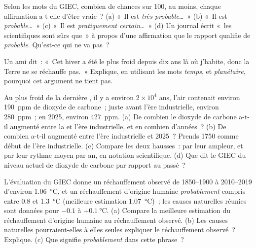 \begin{exercise}[$\star\star$]\label{exo:g9:climate-past-and-present:9}
Selon les mots du GIEC, combien de chances sur 100, au moins, chaque
affirmation a-t-elle d'être vraie~? (a) «~Il est \emph{très probable}\ldots~»
(b) «~Il est \emph{probable}\ldots~» (c) «~Il est \emph{pratiquement
certain}\ldots~» (d) Un journal écrit «~les scientifiques sont sûrs que~» à
propos d'une affirmation que le rapport qualifie de \emph{probable}. Qu'est-ce
qui ne va pas~?
\end{exercise}

\begin{exercise}[$\star\star$]\label{exo:g9:climate-past-and-present:10}
Un ami dit~: «~Cet hiver a été le plus froid depuis dix ans là où
j'habite, donc la Terre ne se réchauffe pas.~» Explique, en utilisant les
mots \emph{temps}, \emph{} et \emph{planétaire}, pourquoi cet
argument ne tient pas.
\end{exercise}

\begin{exercise}[$\star\star\star$]\label{exo:g9:climate-past-and-present:11}
Au plus froid de la dernière , il y a environ $2 \times 10^4$
ans, l'air contenait environ \qty{190}{ppm} de dioxyde de carbone~; juste
avant l'ère industrielle, environ \qty{280}{ppm}~; en 2025, environ
\qty{427}{ppm}. (a) De combien le dioxyde de carbone a-t-il augmenté entre
la  et l'ère industrielle, et en combien d'années~? (b) De
combien a-t-il augmenté entre l'ère industrielle et 2025~? Prends 1750
comme début de l'ère industrielle. (c) Compare les deux hausses~: par leur
ampleur, et par leur rythme moyen par an, en notation scientifique.
(d) Que dit le GIEC du niveau actuel de dioxyde de carbone par rapport au
passé~?
\end{exercise}

\begin{exercise}[$\star\star\star$]\label{exo:g9:climate-past-and-present:12}
L'évaluation du GIEC donne un réchauffement observé de 1850--1900 à
2010--2019 d'environ \qty{1.06}{\degreeCelsius}, et un réchauffement
d'origine humaine \emph{probablement} compris entre 0.8 et
\qty{1.3}{\degreeCelsius} (meilleure estimation
\qty{1.07}{\degreeCelsius})~; les causes naturelles réunies sont données
pour $-0.1$ à $+\qty{0.1}{\degreeCelsius}$. (a) Compare la meilleure
estimation du réchauffement d'origine humaine au réchauffement observé.
(b) Les causes naturelles pourraient-elles à elles seules expliquer le
réchauffement observé~? Explique. (c) Que signifie \emph{probablement}
dans cette phrase~?
\end{exercise}

